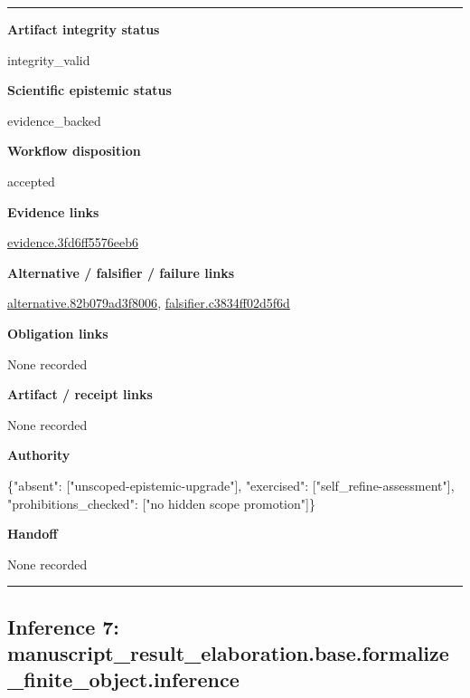 \documentclass[10pt,a4paper]{article}
\newcommand{\TraceField}[2]{\par\noindent\textbf{#1}\par\noindent #2\par\smallskip}
\newenvironment{TraceDossier}{\par\medskip\noindent\hrule\medskip}{\medskip\hrule\par\medskip}
\begin{document}
\begin{TraceDossier}
\TraceField{Artifact integrity status}{integrity\_\allowbreak{}valid}

\TraceField{Scientific epistemic status}{evidence\_\allowbreak{}backed}

\TraceField{Workflow disposition}{accepted}

\TraceField{Evidence links}{\hyperlink{trace-evidence-d0492fbee547ba21fb}{evidence.\allowbreak{}3fd6ff5576\allowbreak{}eeb6}}

\TraceField{Alternative / falsifier / failure links}{\hyperlink{trace-alternative-0d551cb9f3ed9985cf}{alternativ\allowbreak{}e.\allowbreak{}82b079ad3f\allowbreak{}8006}, \hyperlink{trace-alternative-8ae8128d1bc398989f}{falsifier.\allowbreak{}c3834ff02d\allowbreak{}5f6d}}

\TraceField{Obligation links}{None recorded}

\TraceField{Artifact / receipt links}{None recorded}

\TraceField{Authority}{\{"absent":\allowbreak{} ["unscoped\allowbreak{}-\allowbreak{}epistemic-\allowbreak{}upgrade"],\allowbreak{} "exercised\allowbreak{}":\allowbreak{} ["self\_\allowbreak{}refine-\allowbreak{}assessment\allowbreak{}"], "prohibiti\allowbreak{}ons\_\allowbreak{}checked":\allowbreak{} ["no hidden scope promotion"\allowbreak{}]\}}

\TraceField{Handoff}{None recorded}

\end{TraceDossier}
\pagebreak[2]\subsection{Inference 7: manuscript\allowbreak{}\_\allowbreak{}result\_\allowbreak{}elaboratio\allowbreak{}n.\allowbreak{}base.\allowbreak{}formalize\_\allowbreak{}finite\_\allowbreak{}object.\allowbreak{}inference}\label{trace-inference-3e9082d54d31bd7f98}
\end{document}
